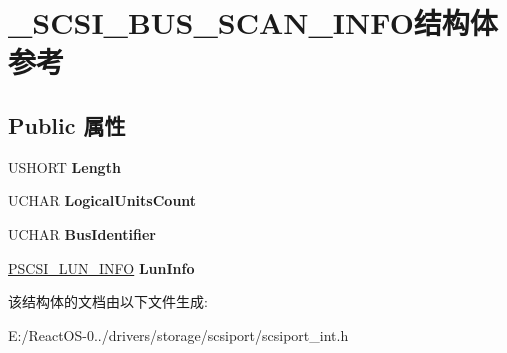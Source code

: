 \hypertarget{struct___s_c_s_i___b_u_s___s_c_a_n___i_n_f_o}{}\section{\+\_\+\+S\+C\+S\+I\+\_\+\+B\+U\+S\+\_\+\+S\+C\+A\+N\+\_\+\+I\+N\+F\+O结构体 参考}
\label{struct___s_c_s_i___b_u_s___s_c_a_n___i_n_f_o}
\subsection*{Public 属性}
\begin{DoxyCompactItemize}
\item 
\mbox{\label{struct___s_c_s_i___b_u_s___s_c_a_n___i_n_f_o_a45e3d4678883bee425733d19e5b05f2c}} 
U\+S\+H\+O\+RT {\bfseries Length}
\item 
\mbox{\label{struct___s_c_s_i___b_u_s___s_c_a_n___i_n_f_o_abc528894a4cd22dbfc3d017f156e61f6}} 
U\+C\+H\+AR {\bfseries Logical\+Units\+Count}
\item 
\mbox{\label{struct___s_c_s_i___b_u_s___s_c_a_n___i_n_f_o_a4cbf3f8e7b63fc6d945c8f50c25df1d1}} 
U\+C\+H\+AR {\bfseries Bus\+Identifier}
\item 
\mbox{\label{struct___s_c_s_i___b_u_s___s_c_a_n___i_n_f_o_a50343c984980448afd21c83bf8eb7c76}} 
\hyperlink{struct___s_c_s_i___l_u_n___i_n_f_o}{P\+S\+C\+S\+I\+\_\+\+L\+U\+N\+\_\+\+I\+N\+FO} {\bfseries Lun\+Info}
\end{DoxyCompactItemize}


该结构体的文档由以下文件生成\+:\begin{DoxyCompactItemize}
\item 
E\+:/\+React\+O\+S-\/0../drivers/storage/scsiport/scsiport\+\_\+int.\+h\end{DoxyCompactItemize}
